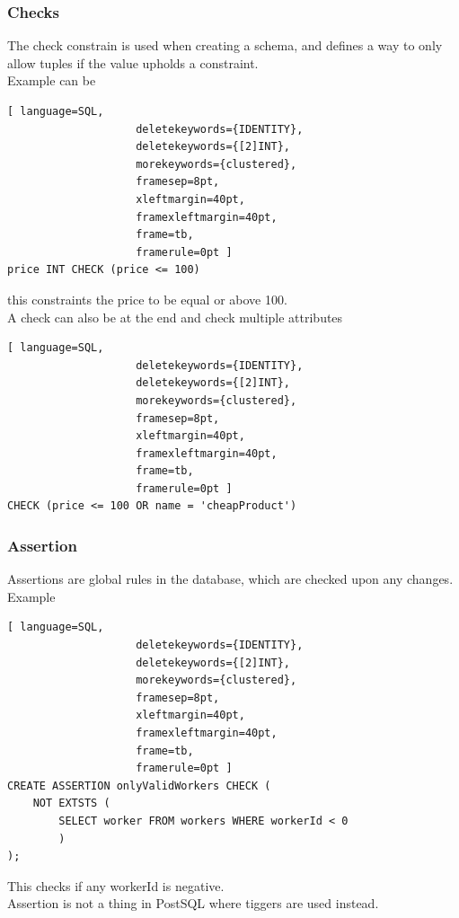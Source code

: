 \documentclass[12pt, a4paper]{article}
\newcommand{\beginSQL}{\begin{lstlisting}[ language=SQL,
                    deletekeywords={IDENTITY},
                    deletekeywords={[2]INT},
                    morekeywords={clustered},
                    framesep=8pt,
                    xleftmargin=40pt,
                    framexleftmargin=40pt,
                    frame=tb,
                    framerule=0pt ]}
\begin{document}
			\subsubsection{Checks}
				The check constrain is used when creating a schema, and defines a way to only allow tuples if the value upholds a constraint.\\
				Example can be \beginSQL
price INT CHECK (price <= 100) \end{lstlisting} this constraints the price to be equal or above 100.\\
				A check can also be at the end and check multiple attributes \beginSQL
CHECK (price <= 100 OR name = 'cheapProduct')\end{lstlisting}
			\subsubsection{Assertion}
				Assertions are global rules in the database, which are checked upon any changes.\\
				Example \beginSQL
CREATE ASSERTION onlyValidWorkers CHECK (
	NOT EXTSTS (
		SELECT worker FROM workers WHERE workerId < 0
		)
);
\end{lstlisting}
				This checks if any workerId is negative.\\
				Assertion is not a thing in PostSQL where tiggers are used instead.
\end{document}
